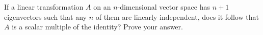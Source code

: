 If a linear transformation $A$ on an $n$-dimensional vector space has
$n+1$ eigenvectors such that any $n$ of them are linearly independent,
does it follow that $A$ is a scalar multiple of the identity? Prove
your answer.
